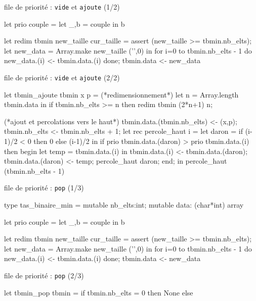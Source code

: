 \begin{adjustwidth}{-3cm}{-3cm}
\begin{implementation}{file de priorité : \texttt{vide} et \texttt{ajoute} (1/2) }
\begin{lstOCaml}
    let prio couple = 
        let _,b = couple in b

    let redim tbmin new_taille cur_taille = 
        assert (new_taille >= tbmin.nb_elts);
        let new_data = Array.make new_taille ('',0) in
        for i=0 to tbmin.nb_elts - 1 do
            new_data.(i) <- tbmin.data.(i)
        done;
        tbmin.data <- new_data
    \end{lstOCaml}
\end{implementation}

\begin{implementation}{file de priorité : \texttt{vide} et \texttt{ajoute} (2/2)}
    \begin{lstOCaml}
    let tbmin_ajoute tbmin x p  =
        (*redimensionnement*)
        let n = Array.length tbmin.data in
        if tbmin.nb_elts >= n then 
            redim tbmin (2*n+1) n;

        (*ajout et percolations vers le haut*)
        tbmin.data.(tbmin.nb_elts) <- (x,p);
        tbmin.nb_elts <- tbmin.nb_elts + 1;
        let rec percole_haut i =
            let daron = if (i-1)/2 < 0 then 0 else (i-1)/2 in
            if prio tbmin.data.(daron) > prio tbmin.data.(i) then begin
                let temp = tbmin.data.(i) in
                tbmin.data.(i) <- tbmin.data.(daron);
                tbmin.data.(daron) <- temp;
                percole_haut daron;
            end;
        in percole_haut (tbmin.nb_elts - 1)
    \end{lstOCaml}
\end{implementation}

\begin{implementation}{file de priorité : \texttt{pop} (1/3)}
    \begin{lstOCaml}
    type tas_binaire_min = {
        mutable nb_elts:int; 
        mutable data: (char*int) array
    }

    let prio couple = 
        let _,b = couple in b

    let redim tbmin new_taille cur_taille = 
        assert (new_taille >= tbmin.nb_elts);
        let new_data = Array.make new_taille ('',0) in
        for i=0 to tbmin.nb_elts - 1 do
            new_data.(i) <- tbmin.data.(i)
        done;
        tbmin.data <- new_data
    \end{lstOCaml}
\end{implementation}

\begin{implementation}{file de priorité : \texttt{pop} (2/3)}
    \begin{lstOCaml}
    let tbmin_pop tbmin =
        if tbmin.nb_elts = 0 then None else
        

\end{lstOCaml}
\end{implementation}
\end{adjustwidth}
